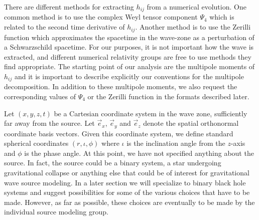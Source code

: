 \documentclass[prd,preprintnumbers,superscriptaddress,eqsecnum]{revtex4}
\numberwithin{equation}{section}
\newcommand{\xhat}{\vec{e}_x}
\newcommand{\yhat}{\vec{e}_y}
\newcommand{\zhat}{\vec{e}_z}
\begin{document}
{There are different methods for extracting $h_{ij}$ from a numerical
evolution.  One common method is to use the complex Weyl tensor
component $\Psi_4$ which is related to the second time derivative of
$h_{ij}$. Another method is to use the Zerilli function which
approximates the spacetime in the wave-zone as a perturbation of a
Schwarzschild spacetime.  For our purposes, it is not important how
the wave is extracted, and different numerical relativity groups are
free to use methods they find appropriate.  The starting point of our
analysis are the multipole moments of $h_{ij}$ and it is important to
describe explicitly our conventions for the multipole decomposition.
In addition to these multipole moments, we also request the
corresponding values of $\Psi_4$ or the Zerilli function in the
formats described later.

Let $(x,y,z,t)$ be a Cartesian coordinate system in the wave zone,
sufficiently far away from the source. Let $\xhat$, $\yhat$ and
$\zhat$ denote the spatial orthonormal coordinate basis vectors.
Given this coordinate system, we define standard spherical coordinates
$(r,\iota,\phi)$ where $\iota$ is the inclination angle from the
$z$-axis and $\phi$ is the phase angle.  At this point, we have not
specified anything about the source.  In fact, the source could be a
binary system, a star undergoing gravitational collapse or anything
else that could be of interest for gravitational wave source modeling.
In a later section we will specialize to binary black hole systems and
suggest possibilities for some of the various choices that have to be
made.  However, as far as possible, these choices are eventually to be
made by the individual source modeling group.

}
\end{document}
